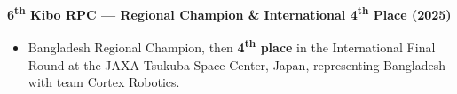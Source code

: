 \noindent
{\noindent\fontsize{12pt}{15pt}\bfseries 6\textsuperscript{th} Kibo RPC --- Regional Champion \& International 4\textsuperscript{th} Place (2025)}
\begin{itemize}
    \item Bangladesh Regional Champion, then \textbf{4\textsuperscript{th} place} in the International Final Round at the JAXA Tsukuba Space Center, Japan, representing Bangladesh with team Cortex Robotics.
\end{itemize}
